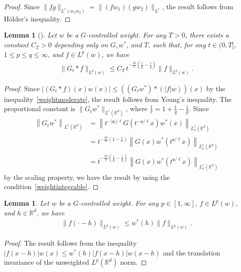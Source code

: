 \documentclass[10pt]{amsart}
\newtheorem{lemm}[theo]{Lemma}
\theoremstyle{definition}
\numberwithin{equation}{section}
\newcommand{\bbR}{\mathbb{R}}
\newcommand{\mfs}{\mathfrak{s}}
\newcommand{\wco}{w^*}
\begin{document}
\begin{proof}
Since $\|fg\|_{L^r(w_1w_2)}=\|(fw_1)(gw_2)\|_{L^r}$, the result follows from H\"older's inequality.
\end{proof}

\begin{lemm}[{\cite[Theorem~2.4]{MW17}}]\label{lem:weightedyoung}
Let $w$ be a $G$-controlled weight. For any $T>0$, there exists a constant $C_T>0$ depending only on $G,\wco$, and $T$, such that, for any $t\in(0,T]$, $1\le p\le q\le\infty$, and $f\in L^p(w)$, we have
\begin{align*}
\|G_t*f\|_{L^q(w)}\le C_T\,t^{-\frac{|\mfs|}\ell\left(\frac1p-\frac1q\right)}\|f\|_{L^p(w)}.
\end{align*}
\end{lemm}

\begin{proof}
Since $|(G_t*f)(x)w(x)|\le((G_t\wco)*(|f|w))(x)$ by the inequality~\eqref{weightmoderate}, the result follows from Young's inequality. The proportional constant is $\|G_t\wco\|_{L^r(\bbR^d)}$, where $\frac1r=1+\frac1q-\frac1p$. Since
\begin{align*}
\left\|G_t\wco\right\|_{L^r(\bbR^d)}&=\left\|t^{-|\mfs|/\ell}G\left(t^{-\mfs/\ell}x\right)\wco(x)\right\|_{L_x^r(\bbR^d)}\\
&=t^{-\frac{|\mfs|}\ell\left(1-\frac1r\right)}\left\|G(x)\wco\left(t^{\mfs/\ell}x\right)\right\|_{L_x^r(\bbR^d)}\\
& =t^{-\frac{|\mfs|}\ell\left(\frac1p-\frac1q\right)}\left\|G(x)\wco\left(t^{\mfs/\ell}x\right)\right\|_{L_x^r(\bbR^d)}
\end{align*}
by the scaling property, we have the result by using the condition~\eqref{weightintegrable}.
\end{proof}



\begin{lemm}\label{lem:weightedtranslation}
Let $w$ be a $G$-controlled weight. For any $p\in[1,\infty]$, $f\in L^p(w)$, and $h\in\bbR^d$, we have
\begin{align*}
\|f(\cdot-h)\|_{L^p(w)}\le \wco(h)\|f\|_{L^p(w)}.
\end{align*}
\end{lemm}

\begin{proof}
The result follows from the inequality $|f(x-h)|w(x)\le \wco(h)|f(x-h)|w(x-h)$ and the translation invariance of the unweighted $L^p(\bbR^d)$ norm.
\end{proof}
\end{document}
